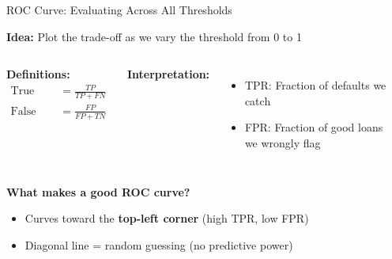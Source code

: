 \documentclass[10pt]{beamer}
\newcommand{\highlight}[1]{\textcolor{AccentOrange}{\textbf{#1}}}
\begin{document}

\begin{frame}{ROC Curve: Evaluating Across All Thresholds}

  \textbf{Idea:} Plot the trade-off as we vary the threshold from 0 to 1

  \vspace{0.3em}
  \begin{columns}[T]
    \textbf{Definitions:}
    \begin{align*}
    \text{True Positive Rate} &= \frac{TP}{TP + FN}\\[0.5em]
    \text{False Positive Rate} &= \frac{FP}{FP + TN}
    \end{align*}

    \vspace{0.5em}
    \textbf{Interpretation:}
    \begin{itemize}
      \item TPR: Fraction of defaults we catch
      \item FPR: Fraction of good loans we wrongly flag
    \end{itemize}

    \begin{center}
    \end{center}
  \end{columns}

  \vspace{1em}
 \textbf{What makes a good ROC curve?}
  \begin{itemize}
    \item Curves toward the \highlight{top-left corner} (high TPR, low FPR)
    \item Diagonal line = random guessing (no predictive power)
  \end{itemize}
\end{frame}
\end{document}
